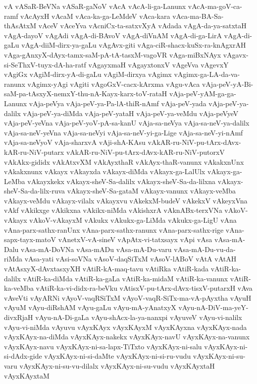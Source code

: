 {vA
vASaR-BeVNa
vASaR-gaNoV
vAcA
vAcA-li-ga-Lanunx
vAcA-ma-goV-ca-ramf
vAcAyxH
vAcaM
vAca-ka-ga-LeMdeV
vAca-kara
vAca-ma-BA-Sa-thAsAtxM
vAceV
vAceYva
vAcniCx-ta-satxvXyA
vAdada
vAgA-da-ya-satxtaH
vAgA-dayoV
vAgAdi
vAgA-di-BAvoV
vAgA-diVnAM
vAgA-di-ga-LirA
vAgA-di-gaLu
vAgA-diiM-dirx-ya-gaLu
vAgAvx-giti
vAga-ciR-shacx-kuSx-ra-knAgxrAH
vAga-gAnxyX-dAyx-tamx-saM-pA-tA-tasxM-vagoVR
vAga-miBxNAyx
vAgavx-si-SeThxV-tuyx-dA-ha-ratf
vAgayxmaH
vAgayxtonxV
vAgeVva
vAgevxY
vAgiGx
vAgiM-dirx-yA-di-gaLu
vAgiM-dirxya
vAgimx
vAgimx-ga-LA-da-va-ranunx
vAgimx-yAgi
vAgiti
vAgoGxV-cacx-kArxma
vAgu-vAca
vAja-peV-yA-Bi-saM-pa-tAsxyX-nemxY-thu-nA-Kayx-karx-toV-rataH
vAja-peV-yAM-ga-ga-Lanunx
vAja-peVya
vAja-peV-ya-Pa-lA-thiR-nAmf
vAja-peV-yada
vAja-peV-ya-dalilx
vAja-peV-ya-diMda
vAja-peV-yataH
vAja-peV-ya-veMdu
vAja-peVyeV
vAja-peV-yeVna
vAja-peV-yoV-pA-sa-kanU
vAja-sa-neVya
vAja-sa-neV-ya-dalilx
vAja-sa-neV-yeVna
vAja-sa-neVyi
vAja-sa-neV-yi-ga-Lige
vAja-sa-neV-yi-nAmf
vAja-sa-neVyoV
vAja-sharxvA
vAji-shA-KAsu
vAkAR-ru-NiV-pu-tArx-dAvx-kAR-ru-NiV-putarx
vAkAR-ru-NiV-pu-tArx-dAvx-kAR-ru-NiV-putorxV
vAkAkx-gididx
vAkAtxvXM
vAkAyxthaR
vAkAyx-thaR-vanunx
vAkakxnUnx
vAkakxnunx
vAkayx
vAkayxda
vAkayx-diMda
vAkayx-ga-LalUlx
vAkayx-ga-LeMba
vAkayxkekx
vAkayx-sheV-Sa-dalilx
vAkayx-sheV-Sa-da-lilxna
vAkayx-sheV-Sa-da-lilx-ruva
vAkayx-sheV-Sa-gataM
vAkayx-vanunx
vAkayx-veMba
vAkayx-veMdu
vAkayx-vilalx
vAkayxvu
vAkekxM-budeV
vAkekxV
vAkeyxVna
vAkf
vAkikxge
vAkikxna
vAkikx-niMda
vAkishxrA
vAknABx-terxVNa
vAkoV-vAkayx
vAkoV-vAkayxM
vAkukx
vAkukx-ga-LiMda
vAkukx-ga-LigU
vAna
vAna-parx-sathx-ranUnx
vAna-parx-sathx-ranunx
vAna-parx-sathx-rige
vAna-sapx-tayx-matoV
vAnetxV-vA-sineV
vApAtx-vi-tatxsayx
vApi
vAsa
vAsa-mA-Dalu
vAsa-mA-DoVNa
vAsa-mADu
vAsa-mA-Du-varu
vAsa-mA-Du-vu-da-riMda
vAsa-yati
vAsi-soVNa
vAsoV-daqSiTxM
vAsoV-lABoV
vAtA
vAtAH
vAtAsxyX-dAvxtasxyXH
vAtiR-kA-maq-tavu
vAtiRka
vAtiR-kada
vAtiR-ka-dalilx
vAtiR-ka-diMda
vAtiR-ka-gaLa
vAtiR-ka-midaM
vAtiR-ka-vanunx
vAtiR-ka-veMba
vAtiR-ka-vi-didx-ra-beVku
vAtisxV-pu-tArx-dAvx-tisxV-putarxH
vAva
vAveVti
vAyARNi
vAyoV-vaqRSiTxM
vAyoV-vaqR-SiTx-ma-vA-pAyxtha
vAyuH
vAyuM
vAyu-diRshAM
vAyu-gaLu
vAyu-mA-yAnatxyX
vAyu-nA-DiV-ma-yeY-divxRjaH
vAyu-nA-Di-gaLa
vAyu-shAcx-la-ya-nanxpi
vAyuveV
vAyu-vi-nalilx
vAyu-vi-niMda
vAyuvu
vAyxKAyx
vAyxKAyxM
vAyxKAyxna
vAyxKAyx-nada
vAyxKAyx-na-diMda
vAyxKAyx-nakekx
vAyxKAyx-navU
vAyxKAyx-na-vanunx
vAyxKAyx-navu
vAyxKAyx-ni-sa-lapx-TiTxto
vAyxKAyx-ni-salu
vAyxKAyx-ni-si-dAdx-gide
vAyxKAyx-ni-si-daMte
vAyxKAyx-ni-si-ru-vudu
vAyxKAyx-ni-su-varu
vAyxKAyx-ni-su-vu-dilalx
vAyxKAyx-ni-su-vudu
vAyxKAyxtaH
vAyxKAyxtaM
}
